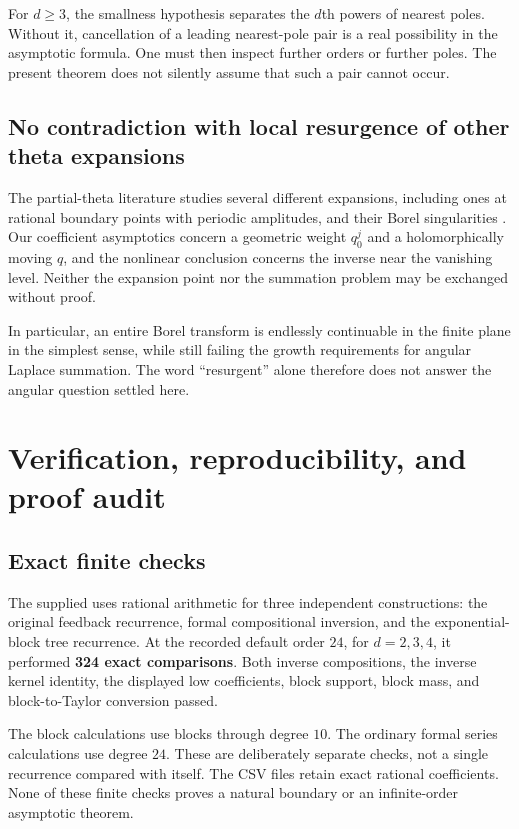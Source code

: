 \documentclass[11pt,a4paper]{article}
\numberwithin{equation}{section}
\theoremstyle{definition}\newtheorem{definition}[theorem]{Definition}
\theoremstyle{remark}\newtheorem{remark}[theorem]{Remark}
\theoremstyle{definition}
\begin{document}
For $d\ge3$, the smallness hypothesis separates the $d$th powers of nearest
poles. Without it, cancellation of a leading nearest-pole pair is a real
possibility in the asymptotic formula. One must then inspect further orders
or further poles. The present theorem does not silently assume that such a
pair cannot occur.

\subsection{No contradiction with local resurgence of other theta expansions}
The partial-theta literature studies several different expansions, including
ones at rational boundary points with periodic amplitudes, and their Borel
singularities \cite{hlss}. Our coefficient asymptotics concern a geometric
weight $q_0^j$ and a holomorphically moving $q$, and the nonlinear conclusion
concerns the inverse near the vanishing level. Neither the expansion point
nor the summation problem may be exchanged without proof.

In particular, an entire Borel transform is endlessly continuable in the
finite plane in the simplest sense, while still failing the growth
requirements for angular Laplace summation. The word ``resurgent'' alone
therefore does not answer the angular question settled here.

\section{Verification, reproducibility, and proof audit}
\label{sec:verification}
\subsection{Exact finite checks}
The supplied  uses rational arithmetic for three
independent constructions: the original feedback recurrence, formal
compositional inversion, and the exponential-block tree recurrence.
At the recorded default order $24$, for $d=2,3,4$, it performed
\textbf{324 exact comparisons}. Both inverse compositions, the inverse
kernel identity, the displayed low coefficients, block support, block mass,
and block-to-Taylor conversion passed.

The block calculations use blocks through degree $10$. The ordinary formal
series calculations use degree $24$. These are deliberately separate
checks, not a single recurrence compared with itself.
The CSV files retain exact rational coefficients. None of these finite
checks proves a natural boundary or an infinite-order asymptotic theorem.
\end{document}
